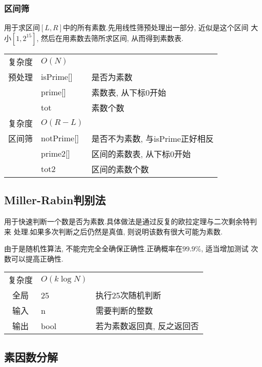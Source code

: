         \subsubsection{区间筛}\small
用于求区间$[L, R]$中的所有素数.先用线性筛预处理出一部分, 近似是这个区间
大小$[1, 2^{15}]$, 然后在用素数去筛所求区间, 从而得到素数表.

\begin{longtable}{|c|l|l|}
复杂度 & $O(N)$ &  \\
预处理 & isPrime[] & 是否为素数 \\
 & prime[] & 素数表, 从下标0开始 \\
 & tot & 素数个数 \\
 复杂度 & $O(R - L)$ &  \\
区间筛 & notPrime[] & 是否不为素数, 与isPrime正好相反 \\
 & prime2[] & 区间的素数表, 从下标0开始 \\
 & tot2 & 区间的素数个数 \\
\end{longtable}



    \subsection{Miller-Rabin判别法}\small
用于快速判断一个数是否为素数.具体做法是通过反复的欧拉定理与二次剩余特判来
处理.如果多次判断之后仍然是真值, 则说明该数有很大可能为素数.

由于是随机性算法, 不能完完全全确保正确性.正确概率在$99.9\%$, 适当增加测试
次数可以提高正确性.

\begin{longtable}{|c|l|l|}
复杂度 & $O(k\log N)$ &  \\
全局 & 25 & 执行25次随机判断 \\
输入 & n & 需要判断的整数 \\
输出 & bool & 若为素数返回真, 反之返回否 \\
\end{longtable}



    \subsection{素因数分解}\small


